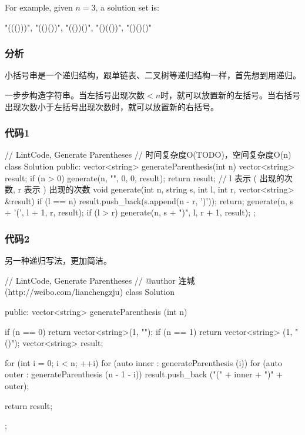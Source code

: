 For example, given $n = 3$, a solution set is:
\begin{Code}
"((()))", "(()())", "(())()", "()(())", "()()()"
\end{Code}

\subsubsection{分析}
小括号串是一个递归结构，跟单链表、二叉树等递归结构一样，首先想到用递归。

一步步构造字符串。当左括号出现次数$<n$时，就可以放置新的左括号。当右括号出现次数小于左括号出现次数时，就可以放置新的右括号。


\subsubsection{代码1}
\begin{Code}
// LintCode, Generate Parentheses
// 时间复杂度O(TODO)，空间复杂度O(n)
class Solution {
public:
    vector<string> generateParenthesis(int n) {
        vector<string> result;
        if (n > 0) generate(n, "", 0, 0, result);
        return result;
    }
    // l 表示 ( 出现的次数, r 表示 ) 出现的次数
    void generate(int n, string s, int l, int r, vector<string> &result) {
        if (l == n) {
            result.push_back(s.append(n - r, ')'));
            return;
        }
        generate(n, s + '(', l + 1, r, result);
        if (l > r) generate(n, s + ")", l, r + 1, result);
    }
};
\end{Code}


\subsubsection{代码2}
另一种递归写法，更加简洁。
\begin{Code}
// LintCode, Generate Parentheses
// @author 连城 (http://weibo.com/lianchengzju)
class Solution {
public:
    vector<string> generateParenthesis (int n) {
        if (n == 0) return vector<string>(1, "");
        if (n == 1) return vector<string> (1, "()");
        vector<string> result;

        for (int i = 0; i < n; ++i)
            for (auto inner : generateParenthesis (i))
                for (auto outer : generateParenthesis (n - 1 - i))
                    result.push_back ("(" + inner + ")" + outer);

        return result;
    }
};
\end{Code}


